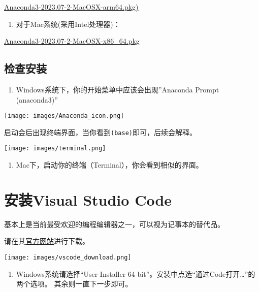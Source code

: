 \documentclass[
  letterpaper,
  DIV=11,
  numbers=noendperiod]{scrreprt}
\providecommand{\tightlist}{%
  \setlength{\itemsep}{0pt}\setlength{\parskip}{0pt}}\usepackage{longtable,booktabs,array}
\begin{document}
\href{https://mirrors.tuna.tsinghua.edu.cn/anaconda/archive/Anaconda3-2023.07-2-MacOSX-arm64.pkg}{Anaconda3-2023.07-2-MacOSX-arm64.pkg)}

\begin{enumerate}
\def\labelenumi{\arabic{enumi}.}
\tightlist
\item
  对于Mac系统(采用Intel处理器)：
\end{enumerate}

\href{https://mirrors.tuna.tsinghua.edu.cn/anaconda/archive/Anaconda3-2023.07-2-MacOSX-x86_64.pkg}{Anaconda3-2023.07-2-MacOSX-x86\_64.pkg}

\hypertarget{ux68c0ux67e5ux5b89ux88c5}{%
\subsection{检查安装}\label{ux68c0ux67e5ux5b89ux88c5}}

\begin{enumerate}
\def\labelenumi{\arabic{enumi}.}
\tightlist
\item
  Windows系统下，你的开始菜单中应该会出现''Anaconda Prompt (anaconda3)''
\end{enumerate}

\texttt{[image: images/Anaconda\_icon.png]}

启动会后出现终端界面，当你看到\texttt{(base)}即可，后续会解释。

\texttt{[image: images/terminal.png]}

\begin{enumerate}
\def\labelenumi{\arabic{enumi}.}
\setcounter{enumi}{1}
\tightlist
\item
  Mac下，启动你的终端（Terminal），你会看到相似的界面。
\end{enumerate}

\hypertarget{ux5b89ux88c5visual-studio-code}{%
\section{安装Visual Studio Code}\label{ux5b89ux88c5visual-studio-code}}

基本上是当前最受欢迎的编程编辑器之一，可以视为记事本的替代品。

请在其\href{https://code.visualstudio.com/download}{官方网站}进行下载。

\texttt{[image: images/vscode\_download.png]}

\begin{enumerate}
\def\labelenumi{\arabic{enumi}.}
\tightlist
\item
  Windows系统请选择``User Installer 64
  bit''。安装中点选``通过Code打开\ldots''的两个选项。
  其余则一直下一步即可。
\end{enumerate}
\end{document}
